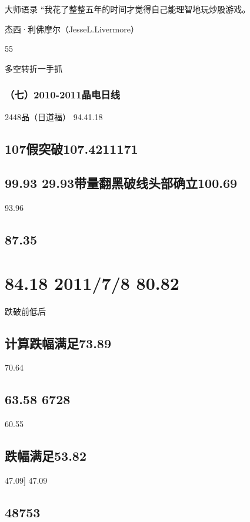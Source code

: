 \documentclass{article}
\begin{document}
大师语录 “我花了整整五年的时间才觉得自己能理智地玩炒股游戏。

杰西·利佛摩尔（JesseL.Livermore）

55

\clearpage

多空转折一手抓

\subsubsection{（七）2010-2011晶电日线}

2448品（日道福） 94.41.18

\subsection{107假突破107.4211171}

\subsection{99.93 29.93带量翻黑破线头部确立100.69}

93.96

\subsection{87.35}

\section{84.18 2011/7/8 80.82}

跌破前低后

\subsection{计算跌幅满足73.89}

70.64

\subsection{63.58 6728}

60.55

\subsection{跌幅满足53.82}

47.09] 47.09

\subsection{48753}
\end{document}
